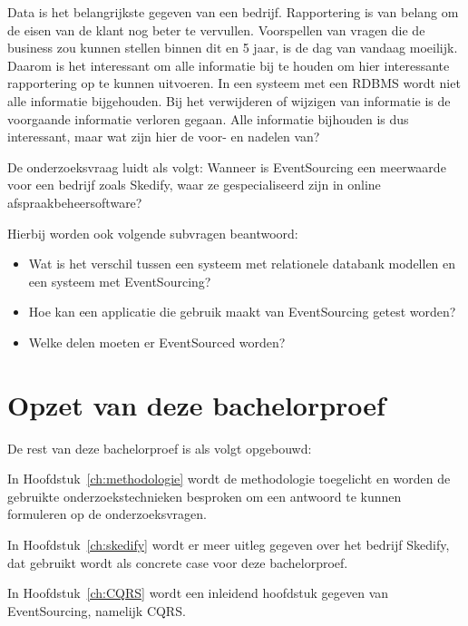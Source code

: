 Data is het belangrijkste gegeven van een bedrijf. Rapportering is van belang om de eisen van de klant nog beter te vervullen. Voorspellen van vragen die de business zou kunnen stellen binnen dit en 5 jaar, is de dag van vandaag moeilijk. Daarom is het interessant om alle informatie bij te houden om hier interessante rapportering op te kunnen uitvoeren. In een systeem met een \gls{RDBMS} wordt niet alle informatie bijgehouden. Bij het verwijderen of wijzigen van informatie is de voorgaande informatie verloren gegaan. Alle informatie bijhouden is dus interessant, maar wat zijn hier de voor- en nadelen van?

De onderzoeksvraag luidt als volgt: Wanneer is EventSourcing een meerwaarde voor een bedrijf zoals Skedify, waar ze gespecialiseerd zijn in online afspraakbeheersoftware?

Hierbij worden ook volgende subvragen beantwoord:

\begin{itemize}
    \item Wat is het verschil tussen een systeem met relationele databank modellen en een systeem met EventSourcing?
    \item Hoe kan een applicatie die gebruik maakt van EventSourcing getest worden?
    \item Welke delen moeten er EventSourced worden?
\end{itemize}

\section{Opzet van deze bachelorproef}
\label{sec:opzet-bachelorproef}


De rest van deze bachelorproef is als volgt opgebouwd:

In Hoofdstuk~\ref{ch:methodologie} wordt de methodologie toegelicht en worden de gebruikte onderzoekstechnieken besproken om een antwoord te kunnen formuleren op de onderzoeksvragen.

In Hoofdstuk~\ref{ch:skedify} wordt er meer uitleg gegeven over het bedrijf Skedify, dat gebruikt wordt als concrete case voor deze bachelorproef.

In Hoofdstuk~\ref{ch:CQRS} wordt een inleidend hoofdstuk gegeven van EventSourcing, namelijk \gls{CQRS}.

